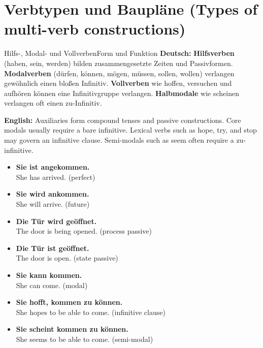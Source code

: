 \documentclass[a4paper,11pt]{article}
\newcommand{\GermanText}[1]{\textbf{Deutsch: }#1\par}
\newcommand{\EnglishText}[1]{{\small\color{SoftGray}\textbf{English: }#1\par}}
\newcommand{\ExampleItem}[2]{\item \textbf{#1}\\{\small\color{SoftGray}#2}}
\newcommand{\DEEN}[2]{\GermanText{#1}\EnglishText{#2}}
\newcommand{\Pair}[2]{\ExampleItem{#1}{#2}}
\begin{document}
\section{Verbtypen und Baupläne \textnormal{(Types of multi-verb constructions)}}
\begin{grammarentry}{Hilfs-, Modal- und Vollverben}{Form und Funktion}
\DEEN{\textbf{Hilfsverben} (haben, sein, werden) bilden zusammengesetzte Zeiten und Passivformen. \textbf{Modalverben} (dürfen, können, mögen, müssen, sollen, wollen) verlangen gewöhnlich einen bloßen Infinitiv. \textbf{Vollverben} wie hoffen, versuchen und aufhören können eine Infinitivgruppe verlangen. \textbf{Halbmodale} wie scheinen verlangen oft einen zu-Infinitiv.}{Auxiliaries form compound tenses and passive constructions. Core modals usually require a bare infinitive. Lexical verbs such as hope, try, and stop may govern an infinitive clause. Semi-modals such as seem often require a zu-infinitive.}
\end{grammarentry}
\begin{exbox}\begin{itemize}
\Pair{Sie ist angekommen.}{She has arrived. (perfect)}
\Pair{Sie wird ankommen.}{She will arrive. (future)}
\Pair{Die Tür wird geöffnet.}{The door is being opened. (process passive)}
\Pair{Die Tür ist geöffnet.}{The door is open. (state passive)}
\Pair{Sie kann kommen.}{She can come. (modal)}
\Pair{Sie hofft, kommen zu können.}{She hopes to be able to come. (infinitive clause)}
\Pair{Sie scheint kommen zu können.}{She seems to be able to come. (semi-modal)}
\end{itemize}\end{exbox}
\end{document}
